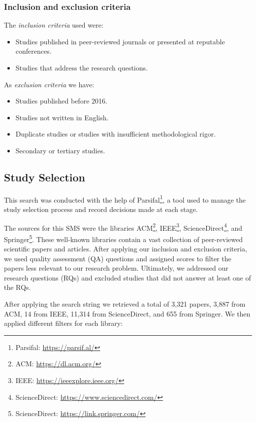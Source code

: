 \subsubsection{Inclusion and exclusion criteria}
The \textit{inclusion criteria} used were:
\begin{itemize}
  \item Studies published in peer-reviewed journals or presented at reputable conferences.
  \item Studies that address the research questions.
\end{itemize}

As \textit{exclusion criteria} we have:
\begin{itemize}
  \item Studies published before 2016.
  \item Studies not written in English.
  \item Duplicate studies or studies with insufficient methodological rigor.
  \item Secondary or tertiary studies.
\end{itemize}

\subsection{Study Selection}

This search was conducted with the help of Parsifal\footnote{Parsifal: \url{https://parsif.al/}}, a tool used to manage the study selection process and 
record decisions made at each stage. 

The sources for this SMS were the libraries ACM\footnote{ACM: \url{https://dl.acm.org/}}, IEEE\footnote{IEEE: \url{https://ieeexplore.ieee.org/}}, 
ScienceDirect\footnote{ScienceDirect: \url{https://www.sciencedirect.com/}}, and Springer\footnote{ScienceDirect: \url{https://link.springer.com/}}. 
These well-known libraries contain a vast collection of peer-reviewed scientific papers and articles. After applying our inclusion and exclusion 
criteria, we used quality assessment (QA) questions and assigned scores to filter the papers less relevant to our research problem. 
Ultimately, we addressed our research questions (RQs) and excluded studies that did not answer at least one of the RQs.

After applying the search string we retrieved a total of 3,321 papers, 3,887 from ACM, 14 from IEEE, 11,314 from ScienceDirect, and 655 from Springer. 
We then applied different filters for each library:

